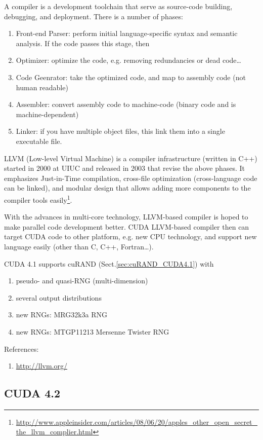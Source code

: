 A compiler is a development toolchain that serve as source-code building,
debugging, and deployment. There is a number of phases:
\begin{enumerate}
  \item Front-end Parser: perform initial language-specific syntax and semantic
  analysis. If the code passes this stage, then
  \item Optimizer: optimize the code, e.g. removing redundancies or dead code\ldots
  \item Code Geenrator: take the optimized code, and map to assembly code
  (not human readable)
  \item Assembler: convert assembly code to machine-code (binary code and is
  machine-dependent)
  \item Linker: if you have multiple object files, this link them into a single
  executable file.
\end{enumerate}
LLVM (Low-level Virtual Machine) is a compiler
infrastructure (written in C++) started in 2000 at UIUC and released in 2003
that revise the above phases. It emphasizes Just-in-Time compilation, cross-file optimization
(cross-language code can be linked), and modular design that allows adding more
components to the compiler tools
easily\footnote{\url{http://www.appleinsider.com/articles/08/06/20/apples_other_open_secret_the_llvm_complier.html}}.

With the advances in multi-core technology, LLVM-based compiler is hoped to make
parallel code development better. CUDA LLVM-based compiler then can target CUDA
code to other platform, e.g. new CPU technology, and support new language easily
(other than C, C++, Fortran\ldots).

CUDA 4.1 supports cuRAND (Sect.\ref{sec:cuRAND_CUDA4.1}) with 
\begin{enumerate}
  \item pseudo- and quasi-RNG (multi-dimension)
  \item several output distributions
  \item new RNGs: MRG32k3a RNG
  \item new RNGs: MTGP11213 Mersenne Twister RNG
\end{enumerate}

References:
\begin{enumerate}
  \item \url{http://llvm.org/}
\end{enumerate}
\subsection{CUDA 4.2}
\label{sec:CUDA_42}


